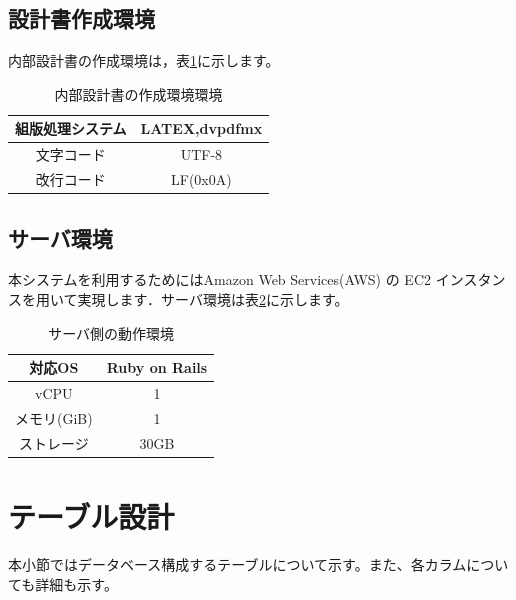 \documentclass[a4j]{jarticle}
\begin{document}
\subsection{設計書作成環境}
内部設計書の作成環境は，表\ref{tab:creating_environment}に示します。
\begin{table}[htb]
\caption{内部設計書の作成環境環境}
\begin{center}
  \begin{tabular}{|c|c|} \hline
    組版処理システム & LATEX,dvpdfmx\\ \hline
   文字コード &  UTF-8\\ \hline
    改行コード & LF(0x0A)  \\ \hline
  \end{tabular}
\label{tab:creating_environment}
\end{center}
\end{table}
\subsection{サーバ環境}
本システムを利用するためにはAmazon Web Services(AWS) の EC2 インスタンスを用いて実現します．サーバ環境は表\ref{tab:server_environment}に示します。
\begin{table}[H]
\caption{サーバ側の動作環境}
\begin{center}
  \begin{tabular}{|c|c|} \hline
    対応OS & Ruby on Rails \\ \hline
   vCPU & 1\\ \hline
    メモリ(GiB) & 1  \\ \hline
    ストレージ & 30GB \\ \hline
  \end{tabular}
\label{tab:server_environment}
\end{center}
\end{table}
\section{テーブル設計}
本小節ではデータベース構成するテーブルについて示す。また、各カラムについても詳細も示す。
\end{document}
